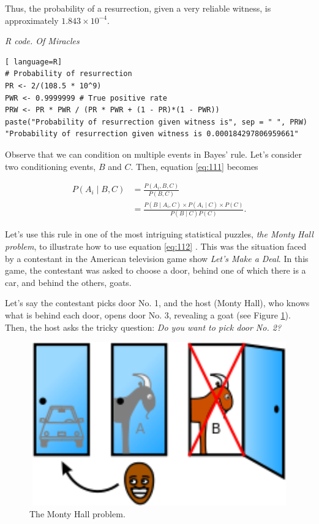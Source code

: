 Thus, the probability of a resurrection, given a very reliable witness, is approximately \( 1.843 \times 10^{-4} \).

\begin{tcolorbox}[enhanced,width=4.67in,center upper,
	fontupper=\large\bfseries,drop shadow southwest,sharp corners]
\textit{R code. Of Miracles}
\begin{VF}
\begin{lstlisting}[ language=R]
# Probability of resurrection
PR <- 2/(108.5 * 10^9) 
PWR <- 0.9999999 # True positive rate
PRW <- PR * PWR / (PR * PWR + (1 - PR)*(1 - PWR)) 
paste("Probability of resurrection given witness is", sep = " ", PRW)
"Probability of resurrection given witness is 0.000184297806959661"
\end{lstlisting}
\end{VF}
\end{tcolorbox}

Observe that we can condition on multiple events in Bayes' rule. Let's consider two conditioning events, \( B \) and \( C \). Then, equation \ref{eq:111} becomes

\begin{align}
	P(A_i\mid B,C)&=\frac{P(A_i,B,C)}{P(B,C)}\nonumber\\
	&=\frac{P(B\mid A_i,C) \times P(A_i\mid C) \times P(C)}{P(B\mid C)P(C)}.
	\label{eq:112}
\end{align}

Let's use this rule in one of the most intriguing statistical puzzles, \textit{the Monty Hall problem}, to illustrate how to use equation \ref{eq:112} \cite{selvin1975problem, selvin1975bproblem}. This was the situation faced by a contestant in the American television game show \textit{Let's Make a Deal}. In this game, the contestant was asked to choose a door, behind one of which there is a car, and behind the others, goats. 

Let's say the contestant picks door No. 1, and the host (Monty Hall), who knows what is behind each door, opens door No. 3, revealing a goat (see Figure \ref{fig11}). Then, the host asks the tricky question: \textit{Do you want to pick door No. 2?}


\begin{figure}
	\includegraphics[width=340pt, height=200pt]{Chapters/chapter1/figures/MHproblem.png}
	\caption[List of figure caption goes here]{The Monty Hall problem.}\label{fig11}
\end{figure}

